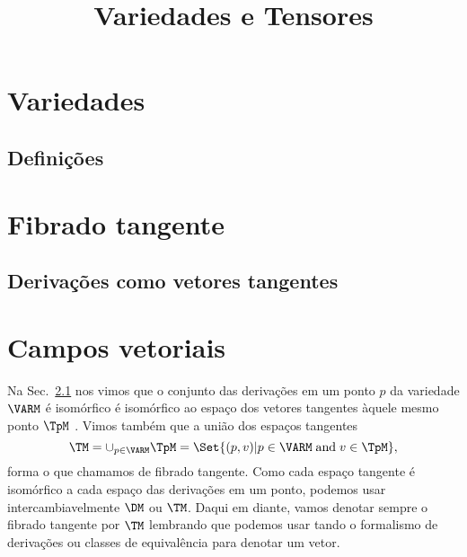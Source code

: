 \newif\ifuseseminar
\useseminarfalse


\title{Variedades e Tensores}


\section{Variedades}
\subsection{Definições}

\section{Fibrado tangente}

\subsection{Derivações como vetores tangentes}
\label{sec:deriv}

\section{Campos vetoriais}

Na Sec.~\ref{sec:deriv} nos vimos que o conjunto das derivações em um ponto $p$
da variedade $\VARM$ é isomórfico é isomórfico ao espaço dos vetores
tangentes àquele mesmo ponto $\TpM$ . Vimos também que a
união dos espaços tangentes
$$\TM = \cup_{p\in\VARM}\TpM = \Set{(p,v) | p\in\VARM\;\text{and}\;v\in \TpM},$$
forma o que chamamos de fibrado tangente. Como cada espaço tangente é isomórfico
a cada espaço das derivações em um ponto, podemos usar intercambiavelmente $\DM$
ou $\TM$. Daqui em diante, vamos denotar sempre o fibrado tangente por $\TM$
lembrando que podemos usar tando o formalismo de derivações ou classes de
equivalência para denotar um vetor.


